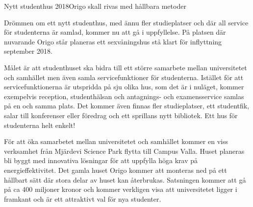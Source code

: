 \begin{news}{3}{Nytt studenthus 2018}{Origo skall rivas med hållbara metoder}{}{}

Drömmen om ett nytt studenthus, med ännu fler studieplatser och där
all service för studenterna är samlad, kommer nu att gå i
uppfyllelse. På platsen där nuvarande Origo står planeras ett
sexvåningshus stå klart för inflyttning september 2018.


Målet är att studenthuset ska bidra till ett större samarbete mellan
universitetet och samhället men även samla servicefunktioner för
studenterna. Istället för att servicefunktionerna är utspridda på sju
olika hus, som det är i nuläget, kommer exempelvis reception,
studenthälsan och antagnings- och examensservice samlas på en och
samma plats. Det kommer även finnas fler studieplatser, ett
studentfik, salar till konferenser eller föredrag och ett sprillans
nytt bibliotek. Ett hus för studenterna helt enkelt!

För att öka samarbetet mellan universitetet och samhället kommer en
viss verksamhet från Mjärdevi Science Park flytta till Campus
Valla. Huset planeras bli byggt med innovativa lösningar för att
uppfylla höga krav på energieffektivitet. Det gamla huset Origo kommer
att monteras ned på ett hållbart sätt där stora delar av huset kan
återbrukas. Satsningen kommer att gå på ca 400 miljoner kronor och
kommer verkligen visa att universitetet ligger i framkant och är ett
attraktivt val för nya studenter.



\end{news}